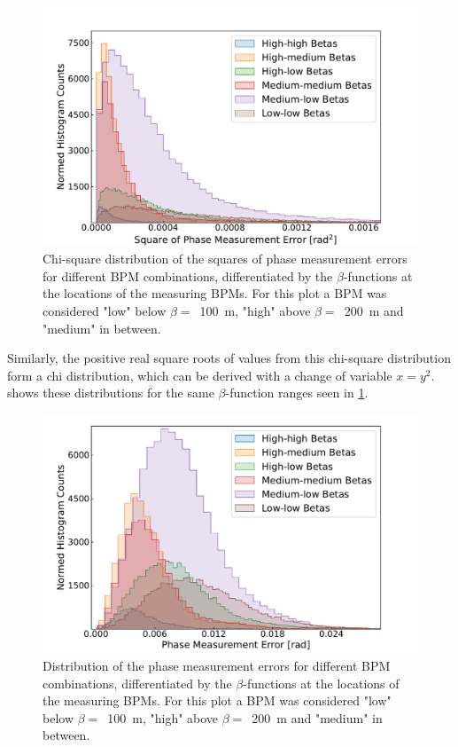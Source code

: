 \begin{figure}[!htb]
    \centering
    \includegraphics*[width=\textwidth]{Figures/Other_Studies/phase_errors_squared_distributions.pdf}
    \caption{Chi-square distribution of the squares of phase measurement errors for different BPM combinations, differentiated by the \(\beta\)-functions at the locations of the measuring BPMs. For this plot a BPM was considered "low" below \(\beta =\)~\qty{100}{\meter}, "high" above \(\beta =\)~\qty{200}{\meter} and "medium" in between.}
    \label{figure:square_errors_histograms}
\end{figure}

Similarly, the positive real square roots of values from this chi-square distribution form a chi distribution, which can be derived with a change of variable \(x=y^2\).
 shows these distributions for the same \(\beta\)-function ranges seen in \cref{figure:square_errors_histograms}.

\begin{figure}[!htb]
    \centering
    \includegraphics*[width=\textwidth]{Figures/Other_Studies/phase_errors_distributions.pdf}
    \caption{Distribution of the phase measurement errors for different BPM combinations, differentiated by the \(\beta\)-functions at the locations of the measuring BPMs. For this plot a BPM was considered "low" below \(\beta =\)~\qty{100}{\meter}, "high" above \(\beta =\)~\qty{200}{\meter} and "medium" in between.}
    \label{figure:phase_errors_histograms}
\end{figure}

